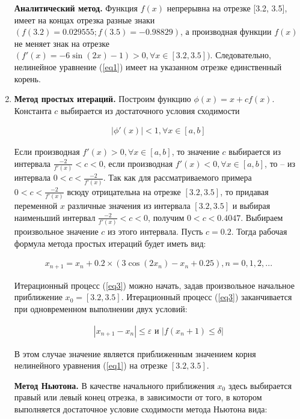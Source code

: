\begin{enumerate}
  \textbf{Аналитический метод.} Функция \(f(x)\) непрерывна на отрезке
  {[}3.2, 3.5{]}, имеет на концах отрезка разные знаки
  \((f(3.2) = 0.029555; f(3.5) = -0.98829)\), а производная функции
  \(f(x)\) не меняет знак на отрезке
  \((f'(x) = -6 \sin(2x) - 1) > 0, \forall x \in [3.2, 3.5])\).
  Следовательно, нелинейное уравнение (\ref{eq1}) имеет на указанном
  отрезке единственный корень.
\item
  \textbf{Метод простых итераций.} Построим функцию
  \(\phi (x) = x + cf(x)\). Константа \(c\) выбирается из достаточного
  условия сходимости

  \begin{align}\label{eq2}
  \left | \phi '(x) \right | < 1, \forall x \in [a, b]
  \end{align}

  Если производная \(f '(x) > 0, \forall x \in [a, b]\), то значение
  \(c\) выбирается из интервала \(\frac{-2}{f'(x)} < c < 0\), если
  производная \(f '(x) < 0, \forall x \in [a, b]\), то -- из интервала
  \(0 < c < \frac{-2}{f'(x)}\). Так как для рассматриваемого примера
  \(0 < c < \frac{-2}{f'(x)}\) всюду отрицательна на отрезке
  \([3.2, 3.5]\), то придавая переменной \(x\) различные значения из
  интервала \([3.2, 3.5]\) и выбирая наименьший интервал
  \(\frac{-2}{f'(x)} < c < 0\), получим \(0 < c < 0.4047\). Выбираем
  произвольное значение \(c\) из этого интервала. Пусть \(c = 0.2\).
  Тогда рабочая формула метода простых итераций будет иметь вид:

  \begin{align}\label{eq3}
  x_{n+1} = x_n + 0.2 \times (3 \cos(2 x_n) - x_n + 0.25), n = 0, 1, 2, ...
  \end{align}

  Итерационный процесс (\ref{eq3}) можно начать, задав произвольное
  начальное приближение \(x_0 = [3.2, 3.5]\). Итерационный процесс
  (\ref{eq3}) заканчивается при одновременном выполнении двух условий:

  \begin{align}\label{eq4}
  \left | x_{n+1} - x_n \right | \leq \varepsilon \text{ и } \left | f(x_n+1) \leq \delta \right |
  \end{align}

  В этом случае значение является приближенным значением корня
  нелинейного уравнения (\ref{eq1}) на отрезке \([3.2, 3.5]\).

  \textbf{Метод Ньютона.} В качестве начального приближения \(x_0\)
  здесь выбирается правый или левый конец отрезка, в зависимости от
  того, в котором выполняется достаточное условие сходимости метода
  Ньютона вида:


\end{enumerate}
